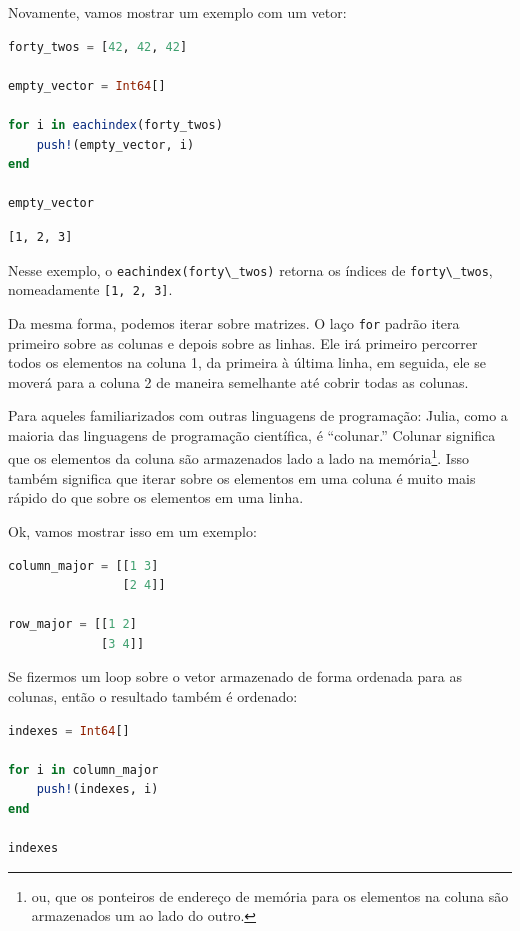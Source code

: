 \documentclass[
  notoc %
]{tufte-book}
\newcommand{\passthrough}[1]{#1}
\begin{document}
Novamente, vamos mostrar um exemplo com um vetor:

\begin{lstlisting}[language=Julia]
forty_twos = [42, 42, 42]

empty_vector = Int64[]

for i in eachindex(forty_twos)
    push!(empty_vector, i)
end

empty_vector
\end{lstlisting}

\begin{lstlisting}[language=Output]
[1, 2, 3]
\end{lstlisting}

Nesse exemplo, o \passthrough{\lstinline!eachindex(forty\_twos)!}
retorna os índices de \passthrough{\lstinline!forty\_twos!},
nomeadamente \passthrough{\lstinline![1, 2, 3]!}.

Da mesma forma, podemos iterar sobre matrizes. O laço
\passthrough{\lstinline!for!} padrão itera primeiro sobre as colunas e
depois sobre as linhas. Ele irá primeiro percorrer todos os elementos na
coluna 1, da primeira à última linha, em seguida, ele se moverá para a
coluna 2 de maneira semelhante até cobrir todas as colunas.

Para aqueles familiarizados com outras linguagens de programação: Julia,
como a maioria das linguagens de programação científica, é ``colunar.''
Colunar significa que os elementos da coluna são armazenados lado a lado
na memória\footnote{ou, que os ponteiros de endereço de memória para os
  elementos na coluna são armazenados um ao lado do outro.}. Isso também
significa que iterar sobre os elementos em uma coluna é muito mais
rápido do que sobre os elementos em uma linha.

Ok, vamos mostrar isso em um exemplo:

\begin{lstlisting}[language=Julia]
column_major = [[1 3]
                [2 4]]

row_major = [[1 2]
             [3 4]]
\end{lstlisting}

Se fizermos um loop sobre o vetor armazenado de forma ordenada para as
colunas, então o resultado também é ordenado:

\begin{lstlisting}[language=Julia]
indexes = Int64[]

for i in column_major
    push!(indexes, i)
end

indexes
\end{lstlisting}
\end{document}
